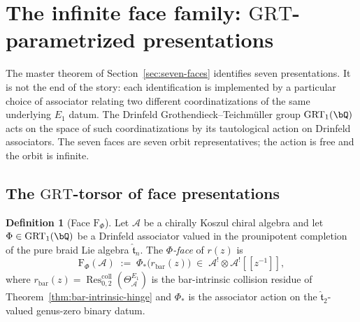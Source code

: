\documentclass[11pt]{article}
\theoremstyle{plain}
\theoremstyle{definition}
\newtheorem{definition}[theorem]{Definition}
\theoremstyle{remark}
\newcommand{\cA}{\mathcal{A}}
\newcommand{\Res}{\operatorname{Res}}
\begin{document}

\section{The infinite face family: $\mathrm{GRT}$-parametrized
presentations}\label{sec:grt-torsor}

The master theorem of Section~\ref{sec:seven-faces} identifies
seven presentations. It is not the end of the story: each
identification is implemented by a particular choice of associator
relating two different coordinatizations of the same underlying
$E_1$ datum. The Drinfeld Grothendieck--Teichmüller group
$\mathrm{GRT}_1(\bQ)$ acts on the space of such coordinatizations by
its tautological action on Drinfeld associators. The seven faces
are seven orbit representatives; the action is free and the
orbit is infinite.

\subsection{The $\mathrm{GRT}$-torsor of face presentations}

\begin{definition}[Face $\mathrm{F}_\Phi$]\label{def:face-phi}
Let $\cA$ be a chirally Koszul chiral algebra and let
$\Phi\in\mathrm{GRT}_1(\bQ)$ be a Drinfeld associator valued in the
prounipotent completion of the pure braid Lie algebra
$\widehat{\mathfrak{t}}_n$. The \emph{$\Phi$-face} of $r(z)$ is
\[
 \mathrm{F}_\Phi(\cA) \;:=\; \Phi_*\bigl(r_{\mathrm{bar}}(z)\bigr)
 \;\in\;\cA^!\otimes\cA^![\![z^{-1}]\!],
\]
where $r_{\mathrm{bar}}(z) =
\Res^{\mathrm{coll}}_{0,2}(\Theta^{E_1}_\cA)$ is the bar-intrinsic
collision residue of Theorem~\textup{\ref{thm:bar-intrinsic-hinge}}
and $\Phi_*$ is the associator action on the
$\widehat{\mathfrak{t}}_2$-valued genus-zero binary datum.
\end{definition}
\end{document}
